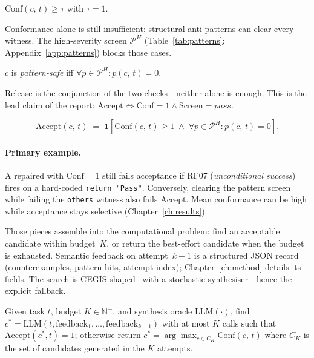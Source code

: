 \begin{definition}
\label{def:strict-success}
$\mathrm{Conf}(c,\,t) \ge \tau$ with $\tau = 1$.
\end{definition}

Conformance alone is still insufficient: structural anti-patterns can clear
every witness.
The high-severity screen $\mathcal{P}^H$ (Table~\ref{tab:patterns};
Appendix~\ref{app:patterns}) blocks those cases.

\begin{definition}
\label{def:pattern-violation}
$c$ is \emph{pattern-safe} iff
$\forall p \in \mathcal{P}^H : p(c,\,t) = 0$.
\end{definition}

Release is the conjunction of the two checks---neither alone is enough.
This is the lead claim of the report:
$\mathrm{Accept}\Leftrightarrow\mathrm{Conf}{=}1\wedge\mathrm{Screen}{=}\mathit{pass}$.

\begin{definition}
\label{def:accept}
\[
  \mathrm{Accept}(c,\,t)
  \;=\;
  \mathbf{1}\!\left[
    \mathrm{Conf}(c,\,t) \geq 1
    \;\land\;
    \forall p \in \mathcal{P}^H : p(c,\,t) = 0
  \right].
\]
\end{definition}

\paragraph{Primary example.}
A repaired  with $\mathrm{Conf}=1$ still fails
acceptance if RF07 (\emph{unconditional success}) fires on a hard-coded
\texttt{return "Pass"}.
Conversely, clearing the pattern screen while failing the \texttt{others}
witness also fails $\mathrm{Accept}$.
Mean conformance can be high while acceptance stays selective
(Chapter~\ref{ch:results}).

Those pieces assemble into the computational problem: find an acceptable
candidate within budget~$K$, or return the best-effort candidate when the
budget is exhausted.
Semantic feedback on attempt~$k{+}1$ is a structured JSON record
(counterexamples, pattern hits, attempt index); Chapter~\ref{ch:method}
details its fields.
The search is CEGIS-shaped~\citep{solarlezama2008sketching,sun2024clover}
with a stochastic synthesiser---hence the explicit fallback.

\begin{definition}
\label{def:bap}
Given task $t$, budget $K \in \mathbb{N}^+$, and synthesis oracle
$\mathrm{LLM}(\cdot)$, find
$c^* = \mathrm{LLM}(t,\mathrm{feedback}_1,\ldots,\mathrm{feedback}_{k-1})$
with at most $K$ calls such that $\mathrm{Accept}(c^*, t) = 1$;
otherwise return
$c^* = \arg\max_{c \in C_K} \mathrm{Conf}(c,\,t)$
where $C_K$ is the set of candidates generated in the $K$ attempts.
\end{definition}


